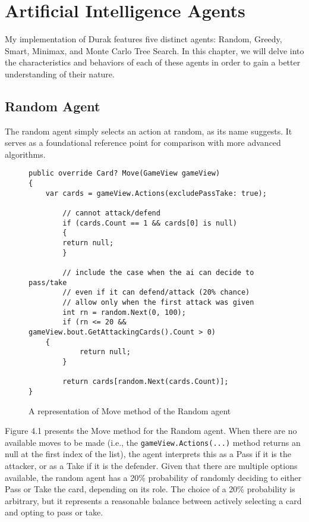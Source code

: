 \chapter{Artificial Intelligence Agents}
\label{AIAgents}

My implementation of Durak features five distinct agents: Random, Greedy, Smart, Minimax, and Monte Carlo Tree Search. In this chapter, we will delve into the characteristics and behaviors of each of these agents in order to gain a better understanding of their nature. 

\section{Random Agent}
The random agent simply selects an action at random, as its name suggests. It serves as a foundational reference point for comparison with more advanced algorithms. 

\begin{figure}[h]
\captionsetup{justification=centering}
\begin{lstlisting}
public override Card? Move(GameView gameView)
{
	var cards = gameView.Actions(excludePassTake: true);

    	// cannot attack/defend
    	if (cards.Count == 1 && cards[0] is null)
    	{
		return null;
    	}

    	// include the case when the ai can decide to pass/take
    	// even if it can defend/attack (20% chance)
    	// allow only when the first attack was given
    	int rn = random.Next(0, 100);
    	if (rn <= 20 && gameView.bout.GetAttackingCards().Count > 0)
	{
        	return null;
    	}

    	return cards[random.Next(cards.Count)];
}
\end{lstlisting}
\caption{A representation of Move method of the Random agent}
\label{fig:randomMove}
\end{figure}

Figure 4.1 presents the Move method for the Random agent. When there are no available moves to be made (i.e., the \texttt{gameView.Actions(...)} method returns an null at the first index of the list), the agent interprets this as a Pass if it is the attacker, or as a Take if it is the defender. Given that there are multiple options available, the random agent has a 20\% probability of randomly deciding to either Pass or Take the card, depending on its role. The choice of a 20\% probability is arbitrary, but it represents a reasonable balance between actively selecting a card and opting to pass or take.


